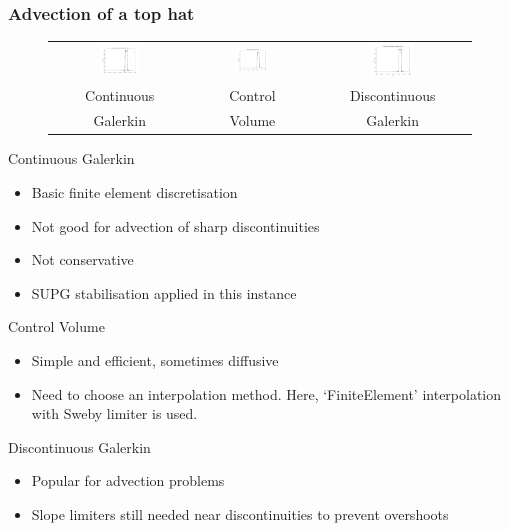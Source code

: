 \begin{frame}
  \frametitle{Advection of a top hat}
  \begin{figure}[ht]
    \begin{tabular}{ccc}
      \includegraphics[width=0.3\textwidth]{./top_hat/top_hat_cg.pdf} &
      \includegraphics[width=0.3\textwidth]{./top_hat/top_hat_cv.pdf} &
      \includegraphics[width=0.3\textwidth]{./top_hat/top_hat_dg.pdf} \\
      Continuous & Control & Discontinuous  \\
       Galerkin &  Volume & Galerkin
    \end{tabular}
  \end{figure}
\end{frame}

\begin{frame}
  Continuous Galerkin
  \begin{itemize}
  \item Basic finite element discretisation
  \item Not good for advection of sharp discontinuities
  \item Not conservative
  \item SUPG stabilisation applied in this instance
  \end{itemize}
  \vspace{5pt}
  Control Volume
  \begin{itemize}
  \item Simple and efficient, sometimes diffusive
  \item Need to choose an interpolation method.  Here, `FiniteElement' interpolation with Sweby limiter is used.
  \end{itemize}
  \vspace{5pt}
  Discontinuous Galerkin
  \begin{itemize}
  \item Popular for advection problems
  \item Slope limiters still needed near discontinuities to prevent overshoots
  \end{itemize}
\end{frame}

